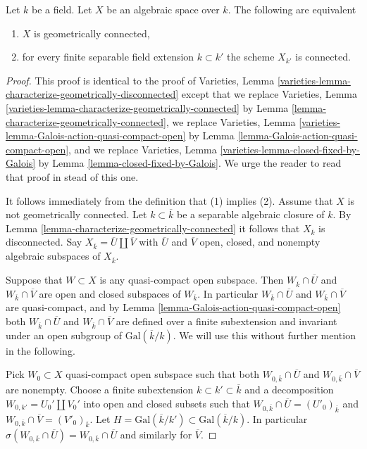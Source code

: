 \begin{lemma}
\label{lemma-characterize-geometrically-disconnected}
Let $k$ be a field. Let $X$ be an algebraic space over $k$.
The following are equivalent
\begin{enumerate}
\item $X$ is geometrically connected,
\item for every finite separable field extension $k \subset k'$
the scheme $X_{k'}$ is connected.
\end{enumerate}
\end{lemma}

\begin{proof}
This proof is identical to the proof of
Varieties, Lemma \ref{varieties-lemma-characterize-geometrically-disconnected}
except that
we replace
Varieties, Lemma \ref{varieties-lemma-characterize-geometrically-connected}
by Lemma \ref{lemma-characterize-geometrically-connected},
we replace
Varieties, Lemma \ref{varieties-lemma-Galois-action-quasi-compact-open}
by Lemma \ref{lemma-Galois-action-quasi-compact-open}, and
we replace
Varieties, Lemma \ref{varieties-lemma-closed-fixed-by-Galois}
by Lemma \ref{lemma-closed-fixed-by-Galois}.
We urge the reader to read that proof in stead of this one.

\medskip\noindent
It follows immediately from the definition that (1) implies (2).
Assume that $X$ is not geometrically connected.
Let $k \subset \overline{k}$ be a separable algebraic
closure of $k$. By
Lemma \ref{lemma-characterize-geometrically-connected}
it follows that $X_{\overline{k}}$ is disconnected.
Say $X_{\overline{k}} = \overline{U} \amalg \overline{V}$
with $\overline{U}$ and $\overline{V}$ open, closed, and nonempty
algebraic subspaces of $X_{\overline{k}}$.

\medskip\noindent
Suppose that $W \subset X$ is any quasi-compact open subspace.
Then $W_{\overline{k}} \cap \overline{U}$ and
$W_{\overline{k}} \cap \overline{V}$ are open and closed subspaces of
$W_{\overline{k}}$. In particular $W_{\overline{k}} \cap \overline{U}$ and
$W_{\overline{k}} \cap \overline{V}$ are quasi-compact, and by
Lemma \ref{lemma-Galois-action-quasi-compact-open}
both $W_{\overline{k}} \cap \overline{U}$ and
$W_{\overline{k}} \cap \overline{V}$
are defined over a finite subextension and invariant under an
open subgroup of $\text{Gal}(\overline{k}/k)$.
We will use this without further mention in the following.

\medskip\noindent
Pick $W_0 \subset X$ quasi-compact open subspace such that both
$W_{0, \overline{k}} \cap \overline{U}$ and
$W_{0, \overline{k}} \cap \overline{V}$ are nonempty.
Choose a finite subextension $k \subset k' \subset \overline{k}$
and a decomposition $W_{0, k'} = U_0' \amalg V_0'$ into open and closed
subsets such that
$W_{0, \overline{k}} \cap \overline{U} = (U'_0)_{\overline{k}}$ and
$W_{0, \overline{k}} \cap \overline{V} = (V'_0)_{\overline{k}}$.
Let $H = \text{Gal}(\overline{k}/k') \subset \text{Gal}(\overline{k}/k)$.
In particular
$\sigma(W_{0, \overline{k}} \cap \overline{U}) =
W_{0, \overline{k}} \cap \overline{U}$ and similarly for
$\overline{V}$.


\end{proof}
